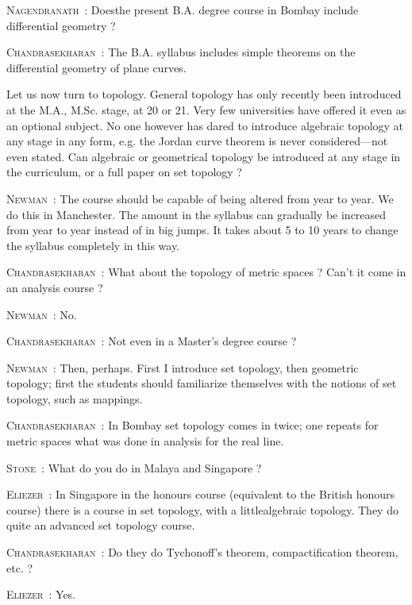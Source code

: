\smallskip
\noindent
\textsc{Nagendranath}~: Does\pageoriginale the present B.A. degree course in Bombay include differential geometry ?

\smallskip
\noindent
\textsc{Chandrasekharan}~: The B.A. syllabus includes simple theorems on the differential geometry of plane curves.

Let us now turn to topology. General topology has only recently been introduced at the M.A., M.Sc. stage, at 20 or 21. Very few universities have offered it even as an optional subject. No one however has dared to introduce algebraic topology at any stage in any form, e.g. the Jordan curve theorem is never considered---not even stated. Can algebraic or geometrical topology be introduced at any stage in the curriculum, or a full paper on set topology ?

\smallskip
\noindent
\textsc{Newman}~: The course should be capable of being altered from year to year. We do this in Manchester. The amount in the syllabus can gradually be increased from year to year instead of in big jumps. It takes about 5 to 10 years to change the syllabus completely in this way.

\smallskip
\noindent
\textsc{Chandrasekharan}~: What about the topology of metric spaces ? Can't it come in an analysis course ?

\smallskip
\noindent
\textsc{Newman}~: No.

\smallskip
\noindent
\textsc{Chandrasekharan}~: Not even in a Master's degree course ?

\smallskip
\noindent
\textsc{Newman}~: Then, perhaps. First I introduce set topology, then geometric topology; first the students should familiarize themselves with the notions of set topology, such as mappings.

\smallskip
\noindent
\textsc{Chandrasekharan}~: In Bombay set topology comes in twice; one repeats for metric spaces what was done in analysis for the real line.

\smallskip
\noindent
\textsc{Stone}~: What do you do in Malaya and Singapore ?

\smallskip
\noindent
\textsc{Eliezer}~: In Singapore in the honours course (equivalent to the British honours course) there is a course in set topology, with a little\pageoriginale algebraic topology. They do quite an advanced set topology course.

\smallskip
\noindent
\textsc{Chandrasekharan}~: Do they do Tychonoff's theorem, compactification theorem, etc. ?

\smallskip
\noindent
\textsc{Eliezer}~: Yes.

